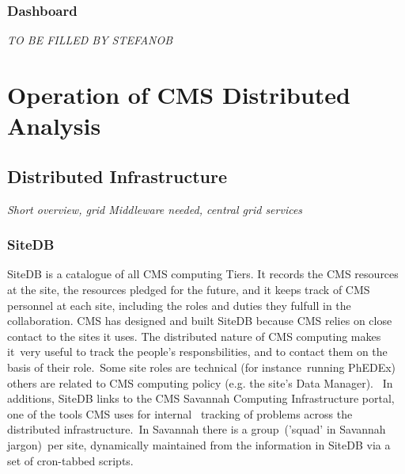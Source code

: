\subsubsection{Dashboard}
\emph{TO BE FILLED BY STEFANOB}

\section{Operation of CMS Distributed Analysis}
\label{sec:4}
\subsection{Distributed Infrastructure}
\label{sec:4_1}
\emph{Short overview, grid Middleware needed, central grid services}

\subsubsection{ SiteDB }
SiteDB is a catalogue of all CMS computing Tiers. It records the CMS resources at the site, the resources pledged for the future, and it keeps track of CMS personnel at each site, including the roles and duties they fulfull in the collaboration.
CMS has designed and built SiteDB because CMS relies on close contact to the sites it uses. The distributed nature of CMS computing makes it very useful to track the people's responsbilities, and to contact them on the basis of their role. Some site roles are technical (for instance running PhEDEx) others are related to CMS computing policy (e.g. the site's Data Manager). 
In additions, SiteDB links to the CMS Savannah Computing Infrastructure portal, one of the tools CMS uses for internal  tracking of problems across the distributed infrastructure. In Savannah there is a group ('squad' in Savannah jargon) per site, dynamically maintained from the information in SiteDB via a set of cron-tabbed scripts.

